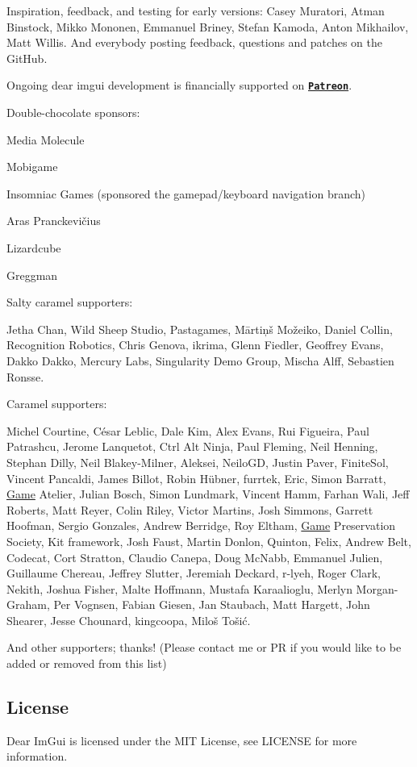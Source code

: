 Inspiration, feedback, and testing for early versions\+: Casey Muratori, Atman Binstock, Mikko Mononen, Emmanuel Briney, Stefan Kamoda, Anton Mikhailov, Matt Willis. And everybody posting feedback, questions and patches on the Git\+Hub.

Ongoing dear imgui development is financially supported on \href{http://www.patreon.com/imgui}{\tt {\bfseries Patreon}}.

Double-\/chocolate sponsors\+:
\begin{DoxyItemize}
\item Media Molecule
\item Mobigame
\item Insomniac Games (sponsored the gamepad/keyboard navigation branch)
\item Aras Pranckevičius
\item Lizardcube
\item Greggman
\end{DoxyItemize}

Salty caramel supporters\+:
\begin{DoxyItemize}
\item Jetha Chan, Wild Sheep Studio, Pastagames, Mārtiņš Možeiko, Daniel Collin, Recognition Robotics, Chris Genova, ikrima, Glenn Fiedler, Geoffrey Evans, Dakko Dakko, Mercury Labs, Singularity Demo Group, Mischa Alff, Sebastien Ronsse.
\end{DoxyItemize}

Caramel supporters\+:
\begin{DoxyItemize}
\item Michel Courtine, César Leblic, Dale Kim, Alex Evans, Rui Figueira, Paul Patrashcu, Jerome Lanquetot, Ctrl Alt Ninja, Paul Fleming, Neil Henning, Stephan Dilly, Neil Blakey-\/\+Milner, Aleksei, Neilo\+GD, Justin Paver, Finite\+Sol, Vincent Pancaldi, James Billot, Robin Hübner, furrtek, Eric, Simon Barratt, \hyperlink{class_game}{Game} Atelier, Julian Bosch, Simon Lundmark, Vincent Hamm, Farhan Wali, Jeff Roberts, Matt Reyer, Colin Riley, Victor Martins, Josh Simmons, Garrett Hoofman, Sergio Gonzales, Andrew Berridge, Roy Eltham, \hyperlink{class_game}{Game} Preservation Society, Kit framework, Josh Faust, Martin Donlon, Quinton, Felix, Andrew Belt, Codecat, Cort Stratton, Claudio Canepa, Doug Mc\+Nabb, Emmanuel Julien, Guillaume Chereau, Jeffrey Slutter, Jeremiah Deckard, r-\/lyeh, Roger Clark, Nekith, Joshua Fisher, Malte Hoffmann, Mustafa Karaalioglu, Merlyn Morgan-\/\+Graham, Per Vognsen, Fabian Giesen, Jan Staubach, Matt Hargett, John Shearer, Jesse Chounard, kingcoopa, Miloš Tošić.
\end{DoxyItemize}

And other supporters; thanks! (Please contact me or PR if you would like to be added or removed from this list)

\subsection*{License }

Dear Im\+Gui is licensed under the M\+IT License, see L\+I\+C\+E\+N\+SE for more information. 